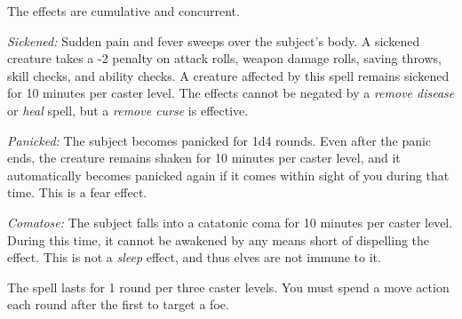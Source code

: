 \documentclass{article}
\begin{document}
The effects are cumulative and concurrent.

\textit{Sickened: }Sudden pain and fever sweeps over the subject's body. A sickened 
creature takes a -2 penalty on attack rolls, weapon damage rolls, saving throws, 
skill checks, and ability checks. A creature affected by this spell remains sickened 
for 10 minutes per caster level. The effects cannot be negated by a \textit{remove 
disease }or \textit{heal }spell, but a \textit{remove curse }is effective.

\textit{Panicked: }The subject becomes panicked for 1d4 rounds. Even after the 
panic ends, the creature remains shaken for 10 minutes per caster level, and it 
automatically becomes panicked again if it comes within sight of you during that 
time. This is a fear effect.

\textit{Comatose: }The subject falls into a catatonic coma for 10 minutes per caster 
level. During this time, it cannot be awakened by any means short of dispelling 
the effect. This is not a \textit{sleep }effect, and thus elves are not immune 
to it.

The spell lasts for 1 round per three caster levels. You must spend a move action 
each round after the first to target a foe.

\newpage
\end{document}
